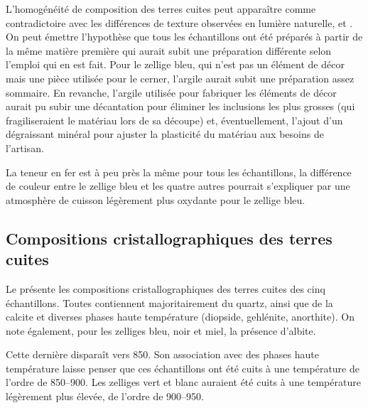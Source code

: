 L'homogénéité de composition des terres cuites peut apparaître comme 
contradictoire avec les différences de texture observées en lumière 
naturelle, \CL et \MEB[ie]. On peut émettre l'hypothèse que tous les 
échantillons ont été préparés à partir de la même matière première 
qui aurait subit une préparation différente selon l'emploi qui en est 
fait. Pour le zellige bleu, qui n'est pas un élément de décor mais une 
pièce utilisée pour le cerner, l'argile aurait subit une préparation 
assez sommaire. En revanche, l'argile utilisée pour fabriquer les 
éléments de décor aurait pu subir une décantation pour éliminer les 
inclusions les plus grosses (qui fragiliseraient le matériau lors de 
sa découpe) et, éventuellement, l'ajout d'un dégraissant minéral pour 
ajuster la plasticité du matériau aux besoins de l'artisan.

La teneur en fer est à peu près la même pour tous les échantillons, 
la différence de couleur entre le zellige bleu et les quatre autres 
pourrait s'expliquer par une atmosphère de cuisson légèrement plus 
oxydante pour le zellige bleu.

\subsection{Compositions cristallographiques des terres cuites}
Le  présente les compositions cristallographiques 
des terres cuites des cinq échantillons. Toutes contiennent 
majoritairement du quartz, ainsi que de la calcite et diverses phases 
haute température (diopside, gehlénite, anorthite). On note également, 
pour les zelliges bleu, noir et miel, la présence d'albite.

Cette dernière disparaît vers \SI{850}{\degC}. Son association avec 
des phases haute température laisse penser que ces échantillons ont 
été cuits à une température de l'ordre de 
\SIrange[range-phrase=\ à\ ]{850}{900}{\degC}. Les zelliges vert et 
blanc auraient été cuits à une température légèrement plus élevée, 
de l'ordre de \SIrange[range-phrase=\ à\ ]{900}{950}{\degC}.


